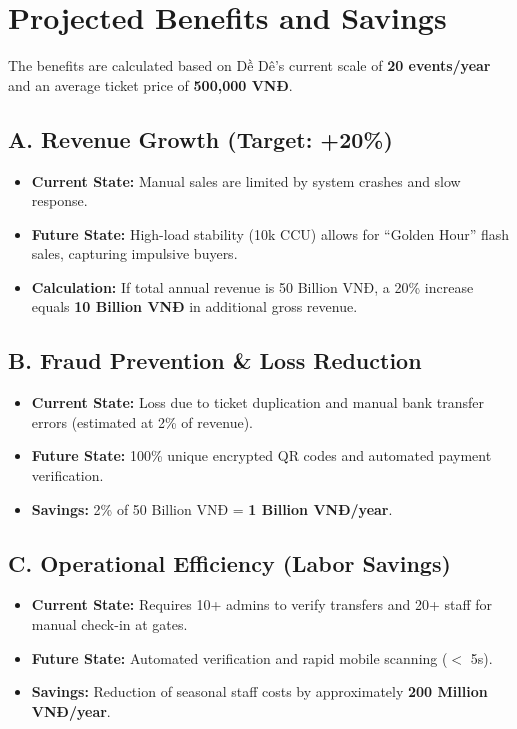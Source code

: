\section{Projected Benefits and Savings}
The benefits are calculated based on Dề Dê’s current scale of \textbf{20 events/year} and an average ticket price of \textbf{500,000 VNĐ}.

\subsection*{A. Revenue Growth (Target: +20\%)}
\begin{itemize}
    \item \textbf{Current State:} Manual sales are limited by system crashes and slow response.
    \item \textbf{Future State:} High-load stability (10k CCU) allows for ``Golden Hour'' flash sales, capturing impulsive buyers.
    \item \textbf{Calculation:} If total annual revenue is 50 Billion VNĐ, a 20\% increase equals \textbf{10 Billion VNĐ} in additional gross revenue.
\end{itemize}

\subsection*{B. Fraud Prevention \& Loss Reduction}
\begin{itemize}
    \item \textbf{Current State:} Loss due to ticket duplication and manual bank transfer errors (estimated at 2\% of revenue).
    \item \textbf{Future State:} 100\% unique encrypted QR codes and automated payment verification.
    \item \textbf{Savings:} 2\% of 50 Billion VNĐ = \textbf{1 Billion VNĐ/year}.
\end{itemize}

\subsection*{C. Operational Efficiency (Labor Savings)}
\begin{itemize}
    \item \textbf{Current State:} Requires 10+ admins to verify transfers and 20+ staff for manual check-in at gates.
    \item \textbf{Future State:} Automated verification and rapid mobile scanning ($<$ 5s).
    \item \textbf{Savings:} Reduction of seasonal staff costs by approximately \textbf{200 Million VNĐ/year}.
\end{itemize}

